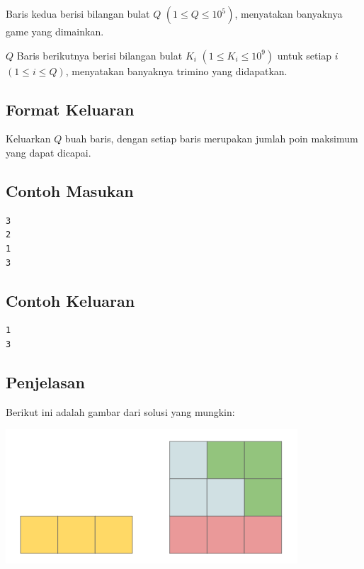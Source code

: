 \documentclass{article}
\begin{document}
Baris kedua berisi bilangan bulat $Q$ $(1 \leq Q \leq 10^5)$, menyatakan banyaknya game yang dimainkan.

$Q$ Baris berikutnya berisi bilangan bulat $K_i$ $(1 \leq K_i \leq 10^9)$ untuk setiap $i$ $(1 \leq i \leq Q)$, menyatakan banyaknya trimino yang didapatkan.

\subsection*{Format Keluaran}
Keluarkan $Q$ buah baris, dengan setiap baris merupakan jumlah poin maksimum yang dapat dicapai.

\begin{multicols}{2}
\subsection*{Contoh Masukan}
\begin{lstlisting}
3
2
1
3
\end{lstlisting}
\columnbreak
\subsection*{Contoh Keluaran}
\begin{lstlisting}
1
3
\end{lstlisting}
\vfill
\null
\end{multicols}

\subsection*{Penjelasan}

Berikut ini adalah gambar dari solusi yang mungkin:

\begin{center}

\includegraphics[scale=0.5]{answer.png}

\end{center}

\pagebreak
\end{document}
